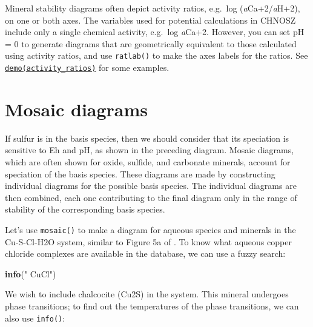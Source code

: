 \documentclass[]{tufte-book}
\newenvironment{Shaded}{}{}
\newcommand{\KeywordTok}[1]{\textcolor[rgb]{0.00,0.44,0.13}{\textbf{#1}}}
\newcommand{\StringTok}[1]{\textcolor[rgb]{0.25,0.44,0.63}{#1}}
\newcommand{\OperatorTok}[1]{\textcolor[rgb]{0.40,0.40,0.40}{#1}}
\newcommand{\NormalTok}[1]{#1}
\begin{document}
Mineral stability diagrams often depict activity ratios, e.g.~log
(\emph{a}Ca+2/\emph{a}H+2), on one or both axes. The variables used for
potential calculations in CHNOSZ include only a single chemical
activity, e.g.~log \emph{a}Ca+2. However, you can set pH = 0 to generate
diagrams that are geometrically equivalent to those calculated using
activity ratios, and use {\texttt{ratlab()}} to make the axes labels for
the ratios. See \href{../demo}{{\texttt{demo(activity\_ratios)}}} for
some examples.

\hypertarget{mosaic-diagrams}{\section{Mosaic
diagrams}\label{mosaic-diagrams}}

If sulfur is in the basis species, then we should consider that its
speciation is sensitive to Eh and pH, as shown in the preceding diagram.
Mosaic diagrams, which are often shown for oxide, sulfide, and carbonate
minerals, account for speciation of the basis species. These diagrams
are made by constructing individual diagrams for the possible basis
species. The individual diagrams are then combined, each one
contributing to the final diagram only in the range of stability of the
corresponding basis species.

Let's use {\texttt{mosaic()}} to make a diagram for aqueous species and
minerals in the Cu-S-Cl-H2O system, similar to Figure 5a of
\citet{CPCC17}. To know what aqueous copper chloride complexes are
available in the database, we can use a fuzzy search:

\begin{Shaded}
\begin{Highlighting}[]
\KeywordTok{info}\NormalTok{(}\StringTok{" CuCl"}\NormalTok{)}
\end{Highlighting}
\end{Shaded}

We wish to include chalcocite (Cu2S) in the system. This mineral
undergoes phase transitions; to find out the temperatures of the phase
transitions, we can also use {\texttt{info()}}:

\begin{Shaded}
\end{Shaded}
\end{document}
